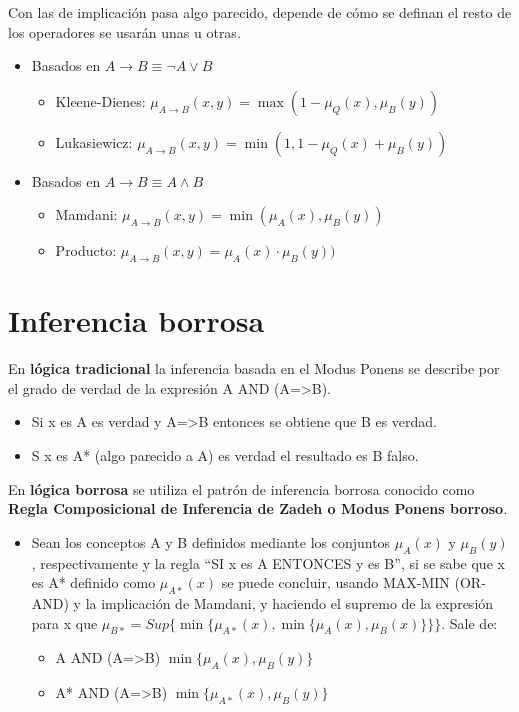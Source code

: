 \documentclass[12pt, twoside, openright]{report} %
\begin{document}
Con las de implicación pasa algo parecido, depende de cómo se definan el resto de los operadores se usarán unas u otras.
\begin{itemize}
	\item Basados en $A \rightarrow B \equiv \neg A \vee B$
	\begin{itemize}
		\item Kleene-Dienes: $\mu_{A\rightarrow B}(x, y)=\max(1-\mu_Q(x),\mu_B(y))$
		\item Lukasiewicz: $\mu_{A\rightarrow B}(x, y)=\min(1, 1-\mu_Q(x)+\mu_B(y))$
	\end{itemize}
	\item Basados en $A \rightarrow B \equiv A \wedge B$
	\begin{itemize}
		\item Mamdani: $\mu_{A\rightarrow B}(x, y)=\min(\mu_A(x),\mu_B(y))$
		\item Producto: $\mu_{A\rightarrow B}(x, y)=\mu_A(x)\cdot \mu_B(y))$
	\end{itemize}
\end{itemize}

\section{Inferencia borrosa}
En \textbf{lógica tradicional} la inferencia basada en el Modus Ponens se describe por el grado de verdad de la expresión A AND (A=>B).
\begin{itemize}
	\item Si x es A es verdad y A=>B entonces se obtiene que B es verdad. 
	\item S x es A* (algo parecido a A) es verdad el resultado es B falso.
\end{itemize}

En \textbf{lógica borrosa} se utiliza el patrón de inferencia borrosa conocido como \textbf{Regla Composicional de Inferencia de Zadeh o Modus Ponens borroso}.
\begin{itemize}
	\item Sean los conceptos A y B definidos mediante los conjuntos $\mu_A(x)$ y $\mu_B(y)$, respectivamente y la regla “SI x es A ENTONCES y es B”, si se sabe que x es A* definido como $\mu_{A*}(x)$ se puede concluir, usando MAX-MIN (OR-AND) y la implicación de Mamdani,  y haciendo el supremo de la expresión para x que $\mu_{B*}=Sup\{\min \{\mu_{A*}(x),\min \{\mu_{A}(x), \mu_{B}(x)\}\}\}$. Sale de:
	\begin{itemize}
		\item A AND (A=>B) $\min\{\mu_A(x), \mu_B(y)\}$
		\item A* AND (A=>B) $\min\{\mu_{A*}(x), \mu_B(y)\}$
	\end{itemize}
\end{itemize}
\end{document}
